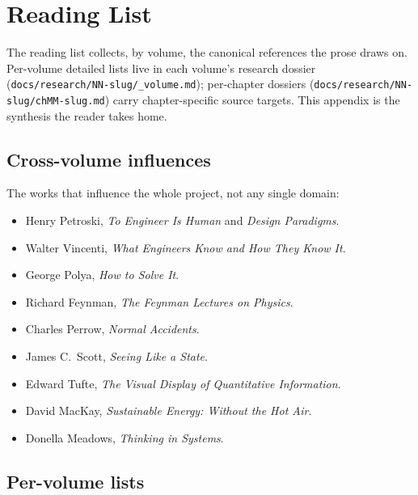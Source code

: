 \chapter{Reading List}
\label{app:reading-list}

\noindent
The reading list collects, by volume, the canonical references the prose draws on. Per-volume detailed lists live in each volume's research dossier (\texttt{docs/research/NN-slug/\_volume.md}); per-chapter dossiers (\texttt{docs/research/NN-slug/chMM-slug.md}) carry chapter-specific source targets. This appendix is the synthesis the reader takes home.


\section*{Cross-volume influences}

The works that influence the whole project, not any single domain:

\begin{itemize}
  \item Henry Petroski, \textit{To Engineer Is Human} and \textit{Design Paradigms}.
  \item Walter Vincenti, \textit{What Engineers Know and How They Know It}.
  \item George Polya, \textit{How to Solve It}.
  \item Richard Feynman, \textit{The Feynman Lectures on Physics}.
  \item Charles Perrow, \textit{Normal Accidents}.
  \item James C.\ Scott, \textit{Seeing Like a State}.
  \item Edward Tufte, \textit{The Visual Display of Quantitative Information}.
  \item David MacKay, \textit{Sustainable Energy: Without the Hot Air}.
  \item Donella Meadows, \textit{Thinking in Systems}.
\end{itemize}

\section*{Per-volume lists}

